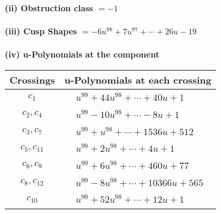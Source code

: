 \documentclass[1p]{elsarticle_modified}
\theoremstyle{definition}
\begin{document}
\flushleft \textbf{(ii) Obstruction class $= -1$}\\~\\
\flushleft \textbf{(iii) Cusp Shapes $= -6 u^{98}+7 u^{97}+\cdots+26 u-19$}\\~\\
\newpage\renewcommand{\arraystretch}{1}
\flushleft \textbf{(iv) u-Polynomials at the component}\newline \\
\begin{tabular}{m{50pt}|m{274pt}}
Crossings & \hspace{64pt}u-Polynomials at each crossing \\
\hline $$\begin{aligned}c_{1}\end{aligned}$$&$\begin{aligned}
&u^{99}+44 u^{98}+\cdots+40 u+1
\end{aligned}$\\
\hline $$\begin{aligned}c_{2},c_{4}\end{aligned}$$&$\begin{aligned}
&u^{99}-10 u^{98}+\cdots-8 u+1
\end{aligned}$\\
\hline $$\begin{aligned}c_{3},c_{7}\end{aligned}$$&$\begin{aligned}
&u^{99}+u^{98}+\cdots+1536 u+512
\end{aligned}$\\
\hline $$\begin{aligned}c_{5},c_{11}\end{aligned}$$&$\begin{aligned}
&u^{99}+2 u^{98}+\cdots+4 u+1
\end{aligned}$\\
\hline $$\begin{aligned}c_{6},c_{9}\end{aligned}$$&$\begin{aligned}
&u^{99}+6 u^{98}+\cdots+460 u+77
\end{aligned}$\\
\hline $$\begin{aligned}c_{8},c_{12}\end{aligned}$$&$\begin{aligned}
&u^{99}-8 u^{98}+\cdots+10366 u+565
\end{aligned}$\\
\hline $$\begin{aligned}c_{10}\end{aligned}$$&$\begin{aligned}
&u^{99}+52 u^{98}+\cdots+12 u+1
\end{aligned}$\\
\hline
\end{tabular}\\~\\
\end{document}
